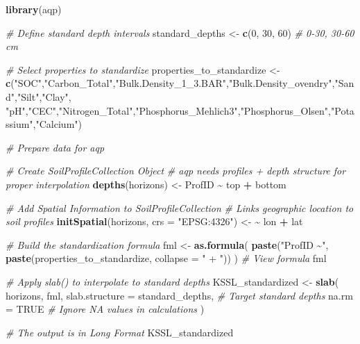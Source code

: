 \documentclass[
  10pt,
  b5paper,
  oneside]{book}
\newenvironment{Shaded}{\begin{snugshade}}{\end{snugshade}}
\newcommand{\AttributeTok}[1]{\textcolor[rgb]{0.13,0.29,0.53}{#1}}
\newcommand{\CommentTok}[1]{\textcolor[rgb]{0.56,0.35,0.01}{\textit{#1}}}
\newcommand{\ConstantTok}[1]{\textcolor[rgb]{0.56,0.35,0.01}{#1}}
\newcommand{\DecValTok}[1]{\textcolor[rgb]{0.00,0.00,0.81}{#1}}
\newcommand{\ErrorTok}[1]{\textcolor[rgb]{0.64,0.00,0.00}{\textbf{#1}}}
\newcommand{\FunctionTok}[1]{\textcolor[rgb]{0.13,0.29,0.53}{\textbf{#1}}}
\newcommand{\NormalTok}[1]{#1}
\newcommand{\OtherTok}[1]{\textcolor[rgb]{0.56,0.35,0.01}{#1}}
\newcommand{\SpecialCharTok}[1]{\textcolor[rgb]{0.81,0.36,0.00}{\textbf{#1}}}
\newcommand{\StringTok}[1]{\textcolor[rgb]{0.31,0.60,0.02}{#1}}
\begin{document}
\begin{Shaded}
\begin{Highlighting}[]
\FunctionTok{library}\NormalTok{(aqp)}

\CommentTok{\# Define standard depth intervals}
\NormalTok{standard\_depths }\OtherTok{\textless{}{-}} \FunctionTok{c}\NormalTok{(}\DecValTok{0}\NormalTok{, }\DecValTok{30}\NormalTok{, }\DecValTok{60}\NormalTok{)  }\CommentTok{\# 0{-}30, 30{-}60 cm}

\CommentTok{\# Select properties to standardize}
\NormalTok{properties\_to\_standardize }\OtherTok{\textless{}{-}} \FunctionTok{c}\NormalTok{(}\StringTok{"SOC"}\NormalTok{,}\StringTok{"Carbon\_Total"}\NormalTok{,}\StringTok{"Bulk.Density\_1\_3.BAR"}\NormalTok{,}\StringTok{"Bulk.Density\_ovendry"}\NormalTok{,}\StringTok{"Sand"}\NormalTok{,}\StringTok{"Silt"}\NormalTok{,}\StringTok{"Clay"}\NormalTok{,}
                               \StringTok{"pH"}\NormalTok{,}\StringTok{"CEC"}\NormalTok{,}\StringTok{"Nitrogen\_Total"}\NormalTok{,}\StringTok{"Phosphorus\_Mehlich3"}\NormalTok{,}\StringTok{"Phosphorus\_Olsen"}\NormalTok{,}\StringTok{"Potassium"}\NormalTok{,}\StringTok{"Calcium"}\NormalTok{)}

\CommentTok{\# Prepare data for aqp}

\CommentTok{\# Create SoilProfileCollection Object}
\CommentTok{\# aqp needs profiles + depth structure for proper interpolation}
\FunctionTok{depths}\NormalTok{(horizons) }\OtherTok{\textless{}{-}}\NormalTok{ ProfID }\SpecialCharTok{\textasciitilde{}}\NormalTok{ top }\SpecialCharTok{+}\NormalTok{ bottom}

\CommentTok{\# Add Spatial Information to SoilProfileCollection}
\CommentTok{\#   Links geographic location to soil profiles}
\FunctionTok{initSpatial}\NormalTok{(horizons, }\AttributeTok{crs =} \StringTok{"EPSG:4326"}\NormalTok{) }\OtherTok{\textless{}{-}} \ErrorTok{\textasciitilde{}}\NormalTok{ lon }\SpecialCharTok{+}\NormalTok{ lat}

\CommentTok{\# Build the standardization formula}
\NormalTok{fml }\OtherTok{\textless{}{-}} \FunctionTok{as.formula}\NormalTok{(}
  \FunctionTok{paste}\NormalTok{(}\StringTok{"ProfID \textasciitilde{}"}\NormalTok{, }\FunctionTok{paste}\NormalTok{(properties\_to\_standardize, }\AttributeTok{collapse =} \StringTok{" + "}\NormalTok{))}
\NormalTok{)}
\CommentTok{\# View formula}
\NormalTok{fml}

\CommentTok{\# Apply slab() to interpolate to standard depths}
\NormalTok{KSSL\_standardized }\OtherTok{\textless{}{-}} \FunctionTok{slab}\NormalTok{(}
\NormalTok{  horizons,}
\NormalTok{  fml,}
  \AttributeTok{slab.structure =}\NormalTok{ standard\_depths,  }\CommentTok{\# Target standard depths}
  \AttributeTok{na.rm =} \ConstantTok{TRUE}                        \CommentTok{\# Ignore NA values in calculations}
\NormalTok{)}

\CommentTok{\# The output is in Long Format}
\NormalTok{KSSL\_standardized }
\end{Highlighting}
\end{Shaded}
\end{document}
